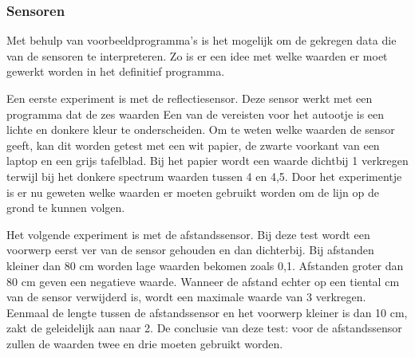 \documentclass[a4paper,twoside,kulak]{kulakreport} %
\begin{document}

\subsubsection{Sensoren}
Met behulp van voorbeeldprogramma's is het mogelijk om de gekregen data die van de sensoren te interpreteren. Zo is er een idee met welke waarden er moet gewerkt worden in het definitief programma. 

Een eerste experiment is met de reflectiesensor. Deze sensor werkt met een programma dat de zes waarden %
Een van de vereisten voor het autootje is een lichte en donkere kleur te onderscheiden. Om te weten welke waarden de sensor geeft, kan dit worden getest met een wit papier, de zwarte voorkant van een laptop en een grijs tafelblad. Bij het papier wordt een waarde dichtbij 1 verkregen terwijl bij het donkere spectrum waarden tussen 4 en 4,5. %
Door het experimentje is er nu geweten welke waarden er moeten gebruikt worden om de lijn op de grond te kunnen volgen.

Het volgende experiment is met de afstandssensor. Bij deze test wordt een voorwerp eerst ver van de sensor gehouden en dan dichterbij. Bij afstanden kleiner dan 80 cm worden lage waarden bekomen zoals 0,1. Afstanden groter dan 80 cm geven een negatieve waarde. Wanneer de afstand echter op een tiental cm van de sensor verwijderd is, wordt een maximale waarde van 3 verkregen. Eenmaal de lengte tussen de afstandssensor en het voorwerp kleiner is dan 10 cm, zakt de geleidelijk aan naar 2. De conclusie van deze test: voor de afstandssensor zullen de waarden twee en drie moeten gebruikt worden.
\end{document}
